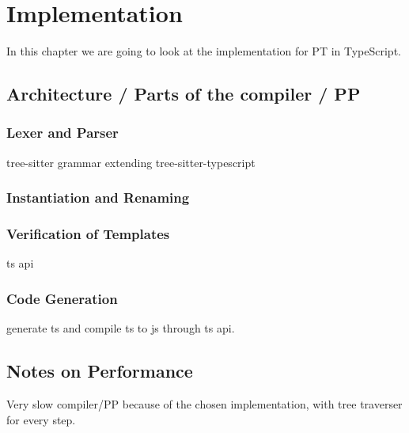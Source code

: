 
\chapter{Implementation}\label{ch:implementation}

In this chapter we are going to look at the implementation for PT in TypeScript.

\section{Architecture / Parts of the compiler / PP}\label{sec:architecture}



\subsection{Lexer and Parser}\label{sec:lexer-and-parser}

tree-sitter grammar extending tree-sitter-typescript

\subsection{Instantiation and Renaming}\label{sec:instantiation-and-renaming}


\subsection{Verification of Templates}\label{sec:verification-of-templates}

ts api

\subsection{Code Generation}\label{sec:code-generation}

generate ts and compile ts to js through ts api.

\section{Notes on Performance}

Very slow compiler/PP because of the chosen implementation, with tree traverser for every step.

